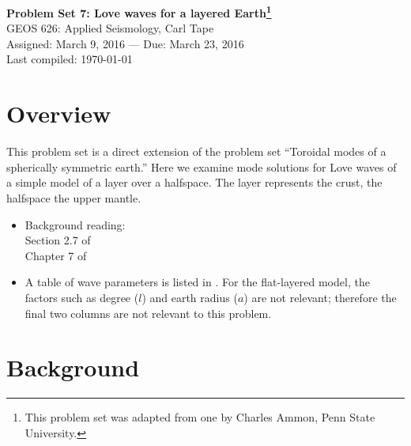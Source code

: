 \documentclass[11pt,titlepage,fleqn]{article}
\begin{document}

\begin{spacing}{1.2}
\centering
{\large \bf Problem Set 7: Love waves for a layered Earth\footnote{This problem set was adapted from one by Charles Ammon, Penn State University.}} \\
GEOS 626: Applied Seismology, Carl Tape \\
Assigned: March 9, 2016 --- Due: March 23, 2016 \\
Last compiled: \today
\end{spacing}


\section*{Overview}

This problem set is a direct extension of the problem set ``Toroidal modes of a spherically symmetric earth.'' Here we examine mode solutions for Love waves of a simple model of a layer over a halfspace. The layer represents the crust, the halfspace the upper mantle.

\begin{itemize}
\item Background reading: \\
Section 2.7 of \citet{SteinWysession} \\
Chapter 7 of \citet{AkiRichardsE2}

\item A table of wave parameters is listed in . For the flat-layered model, the factors such as degree ($l$) and earth radius ($a$) are not relevant; therefore the final two columns are not relevant to this problem.

\end{itemize}


\section*{Background}
\end{document}
